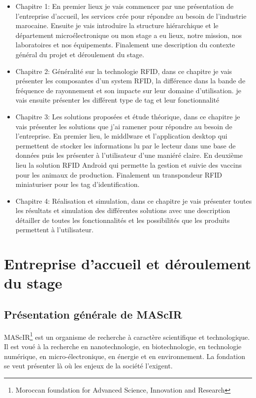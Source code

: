 \documentclass[11pt, a4paper, twoside]{book}
\begin{document}
\begin{itemize}
\item Chapitre 1: En premier lieux je vais commencer par une présentation de l'entreprise d'accueil, les services crée pour répondre au besoin de l'industrie marocaine. Ensuite je vais introduire la structure hiérarchique et le département microélectronique ou mon stage a eu lieux, notre mission, nos laboratoires et nos équipements. Finalement une description du contexte général du projet et déroulement du stage.

\item Chapitre 2: Généralité sur la technologie RFID, dans ce chapitre je vais  présenter les composantes d'un system RFID, la différence dans la bande de fréquence de rayonnement et son impacte sur leur domaine d'utilisation. je vais ensuite présenter les différent type de tag et leur fonctionnalité

\item Chapitre 3: Les solutions proposées et étude théorique, dans ce chapitre je vais présenter les solutions que j'ai ramener pour répondre au besoin de l'entreprise. En premier lieu, le middlware et l'application desktop qui permettent de stocker les informations lu par le lecteur dans une base de données puis les présenter à l'utilisateur d'une maniéré claire. En deuxième lieu la solution RFID Android qui permette la gestion et suivie des vaccins pour les animaux de production. Finalement un transpondeur RFID miniaturiser pour les tag d'identification.

\item Chapitre 4: Réalisation et simulation, dans ce chapitre je vais présenter toutes les résultats et simulation des différentes solutions avec une description détailler de toutes les fonctionnalités et les possibilités que les produits permettent à l'utilisateur.
\end{itemize}

\pagestyle{plain}

\chapter{Entreprise d'accueil et déroulement du stage}
\pagestyle{headings}
\section{Présentation générale de MAScIR}
MAScIR\footnote{Moroccan foundation for Advanced Science, Innovation and Research} est un organisme de recherche à caractère scientifique et technologique. Il est voué à la recherche en nanotechnologie, en biotechnologie, en technologie numérique, en micro-électronique, en énergie et en environnement. La fondation se veut présenter là où les enjeux de la société l’exigent.\\
\end{document}
